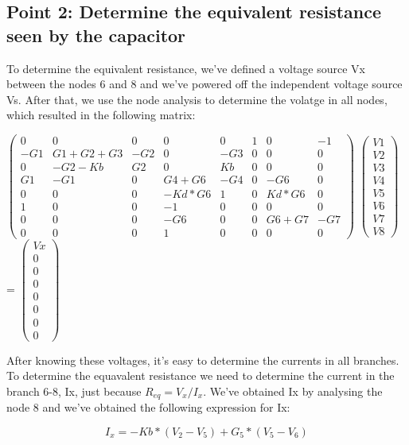 \subsection{Point 2: Determine the equivalent resistance seen by the capacitor}

To determine the equivalent resistance, we've defined a voltage source Vx between the nodes 6 and 8 and we've powered off the independent voltage source Vs. After that, we use the node analysis to determine the volatge in all nodes, which resulted in the following matrix:

$\begin{pmatrix}
0 & 0 & 0 & 0 & 0 & 1 & 0 & -1\\
-G1 & G1+G2+G3 & -G2 & 0 & -G3 & 0 & 0 & 0\\
0 & -G2-Kb & G2 & 0 & Kb & 0 & 0 & 0 \\
G1 & -G1 & 0 & G4+G6 & -G4 & 0 & -G6 & 0\\
0 & 0 & 0 & -Kd*G6 & 1 & 0 & Kd*G6 & 0 \\
1 & 0 & 0 & -1 & 0 & 0 & 0 & 0\\
0 & 0 & 0 & -G6 & 0 & 0 & G6+G7 & -G7  \\ 
0 & 0 & 0 & 1 & 0 & 0 & 0 & 0
\end{pmatrix}$
$\begin{pmatrix}
V1\\
V2\\
V3\\
V4\\
V5\\
V6\\
V7\\
V8
\end{pmatrix}$
=
$\begin{pmatrix}
Vx\\
0\\
0\\
0\\
0\\
0\\
0\\
0
\end{pmatrix}$

After knowing these voltages, it's easy to determine the currents in all branches. To determine the equavalent resistance we need to determine the current in the branch 6-8, Ix, just because $R_{eq}=V_{x}/I_{x}$. We've obtained Ix by analysing the node 8 and we've obtained the following expression for Ix:

\begin{equation}
I_x = -Kb*(V_2 - V_5) + G_5*(V_5 - V_6) 
\end{equation}

